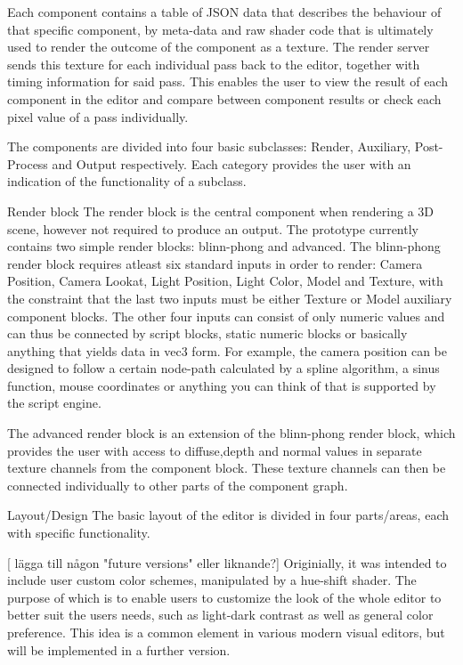 Each component contains a table of JSON data that describes the behaviour of that specific component, by meta-data and raw shader code that is ultimately used to render the outcome of the component as a texture. The render server sends this texture for each individual pass back to the editor, together with timing information for said pass. This enables the user to view the result of each component in the editor and compare between component results or check each pixel value of a pass individually. 

The components are divided into four basic subclasses: Render, Auxiliary, Post-Process and Output respectively. Each category provides the user with an indication of the functionality of a subclass. 

Render block
The render block is the central component when rendering a 3D scene, however not required to produce an output. The prototype currently contains two simple render blocks: blinn-phong and advanced. The blinn-phong render block requires atleast six standard inputs in order to render: Camera Position, Camera Lookat, Light Position, Light Color, Model and Texture, with the constraint that the last two inputs must be either Texture or Model auxiliary component blocks. The other four inputs can consist of only numeric values and can thus be connected by script blocks, static numeric blocks or basically anything that yields data in vec3 form. For example, the camera position can be designed to follow a certain node-path calculated by a spline algorithm, a sinus function, mouse coordinates or anything you can think of that is supported by the script engine. 

The advanced render block is an extension of the blinn-phong render block, which provides the user with access to diffuse,depth  and normal values in separate texture channels from the component block. These texture channels can then be connected individually to other parts of the component graph. 

Layout/Design
The basic layout of the editor is divided in four parts/areas, each with specific functionality.  

[ lägga till någon "future versions" eller liknande?]
Originially, it was intended to include user custom color schemes, manipulated by a hue-shift shader. The purpose of which is to enable users to customize the look of the whole editor to better suit the users needs, such as light-dark contrast as well as general color preference. This idea is a common element in various modern visual editors, but will be implemented in a further version. 

